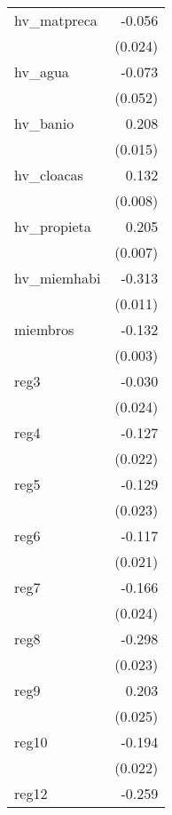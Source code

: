 {\begin{longtable}{l*{1}{D{.}{.}{-1}}}
\addlinespace
hv\_matpreca &      -0.056\sym{*}  \\
            &     (0.024)         \\
\addlinespace
hv\_agua     &      -0.073         \\
            &     (0.052)         \\
\addlinespace
hv\_banio    &       0.208\sym{***}\\
            &     (0.015)         \\
\addlinespace
hv\_cloacas  &       0.132\sym{***}\\
            &     (0.008)         \\
\addlinespace
hv\_propieta &       0.205\sym{***}\\
            &     (0.007)         \\
\addlinespace
hv\_miemhabi &      -0.313\sym{***}\\
            &     (0.011)         \\
\addlinespace
miembros    &      -0.132\sym{***}\\
            &     (0.003)         \\
\addlinespace
reg3        &      -0.030         \\
            &     (0.024)         \\
\addlinespace
reg4        &      -0.127\sym{***}\\
            &     (0.022)         \\
\addlinespace
reg5        &      -0.129\sym{***}\\
            &     (0.023)         \\
\addlinespace
reg6        &      -0.117\sym{***}\\
            &     (0.021)         \\
\addlinespace
reg7        &      -0.166\sym{***}\\
            &     (0.024)         \\
\addlinespace
reg8        &      -0.298\sym{***}\\
            &     (0.023)         \\
\addlinespace
reg9        &       0.203\sym{***}\\
            &     (0.025)         \\
\addlinespace
reg10       &      -0.194\sym{***}\\
            &     (0.022)         \\
\addlinespace
reg12       &      -0.259\sym{***}\\

\end{longtable}}
